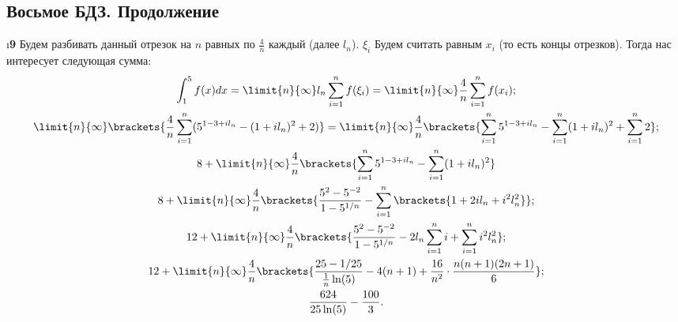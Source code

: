 \subsection{Восьмое БДЗ. Продолжение}

\setcounter{iii}{14}

\i \textbf{9} Будем разбивать данный отрезок на $n$ равных по $\frac{4}{n}$ каждый (далее $l_n$). $\xi_i$ Будем считать равным $x_i$ (то есть концы отрезков). Тогда нас интересует следующая сумма:
\begin{gather*}
    \int_1^5 f(x)dx = \limit{n}{\infty} l_n \sum_{i=1}^{n} f(\xi_i) = \limit{n}{\infty} \frac{4}{n} \sum_{i=1}^{n} f(x_i);\\
    \limit{n}{\infty} \brackets{\frac{4}{n}\sum_{i=1}^{n} (5^{1-3+il_n} - (1+il_n)^2 + 2)} = \limit{n}{\infty} \frac{4}{n}\brackets{\sum_{i=1}^{n}5^{1-3+il_n} - \sum_{i=1}^{n}(1+il_n)^2 + \sum_{i=1}^{n}2};\\
    8 + \limit{n}{\infty} \frac{4}{n}\brackets{\sum_{i=1}^{n}5^{1-3+il_n} - \sum_{i=1}^{n}(1+il_n)^2}\\
    8 + \limit{n}{\infty}\frac{4}{n}\brackets{\frac{5^2 - 5^{-2}}{1-5^{1/n}} - \sum_{i=1}^{n}\brackets{1 + 2il_n + i^2l_n^2}};\\
    12 + \limit{n}{\infty}\frac{4}{n}\brackets{\frac{5^2 - 5^{-2}}{1-5^{1/n}} - 2l_n\sum_{i=1}^{n}i + \sum_{i=1}^{n}i^2l_n^2};\\
    12 + \limit{n}{\infty}\frac{4}{n}\brackets{\frac{25 - 1/25}{\frac{1}{n}\ln(5)} - 4(n+1) + \frac{16}{n^2}\cdot\frac{n(n+1)(2n+1)}{6}};\\
    \frac{624}{25\ln(5)} - \frac{100}{3}.
\end{gather*}